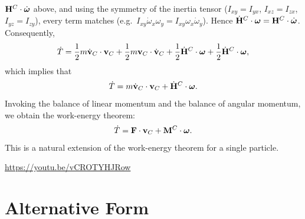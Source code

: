 \documentclass[
  letterpaper,
  DIV=11,
  numbers=noendperiod]{scrreprt}
\newcommand{\bomega}{\boldsymbol{\omega}}
\begin{document}
\({\bf H}^C\cdot\dot{\bomega}\) above, and using the symmetry of the
inertia tensor (\(I_{xy}=I_{yx}\), \(I_{xz}=I_{zx}\),
\(I_{yz}=I_{zy}\)), every term matches
(e.g.~\(I_{xy}\dot{\omega}_x\omega_y = I_{xy}\omega_x\dot{\omega}_y\)).
Hence \(\dot{\bf H}^C\cdot\bomega = {\bf H}^C\cdot\dot{\bomega}\).
Consequently, \begin{align}
    \dot{T} = \frac{1}{2}m\dot{\bf v}_C\cdot{\bf v}_C+\frac{1}{2}m{\bf v}_C\cdot\dot{\bf v}_C+\frac{1}{2}\dot{\bf H}^C\cdot\bomega+\frac{1}{2}\dot{\bf H}^C\cdot\bomega,
\end{align} which implies that \begin{align}
    \dot{T} = m\dot{\bf v}_C\cdot{\bf v}_C+\dot{\bf H}^C\cdot\bomega.
\end{align} Invoking the balance of linear momentum and the balance of
angular momentum, we obtain the work-energy theorem: \begin{align}
    \dot{T} = {\bf F}\cdot{\bf v}_C+{\bf M}^C\cdot\bomega.
\end{align} This is a natural extension of the work-energy theorem for a
single particle.

\url{https://youtu.be/vCROTYHJRow}

\section{Alternative Form}\label{alternative-form}
\end{document}
